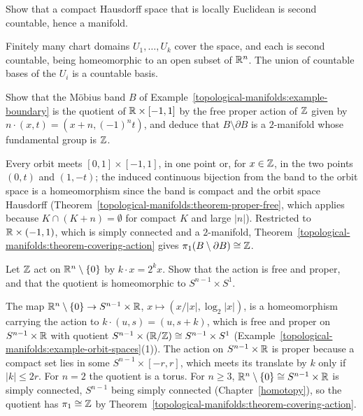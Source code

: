 \begin{exercise}\label{topological-manifolds:exercise-compact-second-countable}
Show that a compact Hausdorff space that is locally Euclidean is second countable, hence a manifold.
\end{exercise}

\begin{solution}
Finitely many chart domains $U_1, \ldots, U_k$ cover the space, and each is second countable, being homeomorphic to an open subset of $\mathbb{R}^n$. The union of countable bases of the $U_i$ is a countable basis.
\end{solution}

\begin{exercise}\label{topological-manifolds:exercise-mobius}
Show that the Möbius band $B$ of Example~\ref{topological-manifolds:example-boundary} is the quotient of $\mathbb{R} \times [-1, 1]$ by the free proper action of $\mathbb{Z}$ given by $n \cdot (x, t) = (x + n, (-1)^nt)$, and deduce that $B \setminus \partial B$ is a
$2$-manifold whose fundamental group is $\mathbb{Z}$.
\end{exercise}

\begin{solution}
Every orbit meets $[0, 1] \times [-1, 1]$, in one point or, for $x \in \mathbb{Z}$, in the two points $(0, t)$ and $(1, -t)$; the induced continuous bijection from the band to the orbit space is a homeomorphism since the band is compact and the
orbit space Hausdorff (Theorem~\ref{topological-manifolds:theorem-proper-free}, which applies because $K \cap (K + n) = \emptyset$ for compact $K$ and large $|n|$). Restricted to $\mathbb{R} \times (-1, 1)$, which is simply connected and a
$2$-manifold, Theorem~\ref{topological-manifolds:theorem-covering-action} gives $\pi_1(B \setminus \partial B) \cong \mathbb{Z}$.
\end{solution}

\begin{exercise}\label{topological-manifolds:exercise-hopf}
Let $\mathbb{Z}$ act on $\mathbb{R}^n \setminus \{0\}$ by $k \cdot x = 2^kx$. Show that the action is free and proper, and that the quotient is homeomorphic to $S^{n-1} \times S^1$.
\end{exercise}

\begin{solution}
The map $\mathbb{R}^n \setminus \{0\} \to S^{n-1} \times \mathbb{R}$, $x \mapsto (x/|x|, \log_2|x|)$, is a homeomorphism carrying the action to $k \cdot (u, s) = (u, s + k)$, which is free and proper on $S^{n-1} \times \mathbb{R}$ with quotient
$S^{n-1} \times (\mathbb{R}/\mathbb{Z}) \cong S^{n-1} \times S^1$ (Example~\ref{topological-manifolds:example-orbit-spaces}(1)). The action on $S^{n-1} \times \mathbb{R}$ is proper
because a compact set lies in some $S^{n-1} \times [-r, r]$, which meets its translate by $k$ only if $|k| \leq 2r$. For $n = 2$ the quotient is a torus. For $n \geq 3$, $\mathbb{R}^n \setminus \{0\} \cong S^{n-1} \times \mathbb{R}$ is simply
connected, $S^{n-1}$ being simply connected (Chapter~\ref{homotopy}), so the quotient has $\pi_1 \cong \mathbb{Z}$ by Theorem~\ref{topological-manifolds:theorem-covering-action}.
\end{solution}

